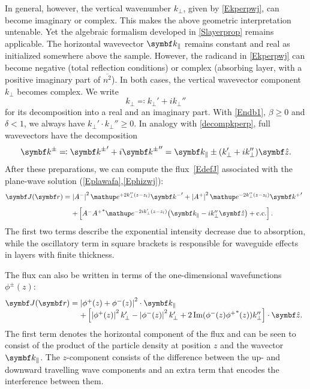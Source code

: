 In general, however, the vertical wavenumber $k_{\perp}$,
given by \cref{Ekperpwj},
can become imaginary or complex.
This makes the above geometric interpretation untenable.
Yet the algebraic formalism developed in \cref{Slayerprop}
remains applicable.
The horizontal wavevector $\k_\plll$ remains constant and real
as initialized somewhere above the sample.
However, the radicand in \cref{Ekperpwj} can become
negative (total reflection conditions) or complex
(absorbing layer,
with a positive imaginary part of $\overline{n^2}$).
In both cases, the vertical wavevector component $k_{\perp}$
becomes complex.
%
We write
\begin{equation}\label{decompkperp}
  k_\perp \eqqcolon k_\perp' + i k_\perp''
\end{equation}
for its decomposition into a real and an imaginary part.
With \cref{Endb1}, $\beta\ge0$ and $\delta<1$,
we always have $k_\perp'\cdot k_\perp''\ge0$.
In analogy with \cref{decompkperp},
full wavevectors have the decomposition
\begin{equation}
  \k^\pm
  \eqqcolon {\k^\pm}' + i{\k^\pm}''
  = \k_\plll \pm (k_\perp' + i k_\perp'')\v{\hat z}.
\end{equation}
After these preparations,
we can compute the flux~\cref{EdefJ}
associated with the plane-wave solution (\ref{Eplawafa},\ref{Ephizwj}):
\begin{equation}
  \begin{array}{@{}l@{\;}l}
  \v{J}(\r)
  =&   \left|A^-\right|^2 \e^{+2k_\perp'' (z-z_l)} {\k^-}'
    + \left|A^+\right|^2 \e^{-2k_\perp''(z-z_l)} {\k^+}'
\\[2ex]
  &+ \left[
      A^-{A^+}^* \e^{-2ik_\perp'(z-z_l)} {\left(\k_\plll-ik_\perp''\v{\hat z}\right)}
    + \text{c.c.}
    \right].
  \end{array}
\end{equation}
The first two terms describe the exponential intensity decrease
due to absorption, while
the oscillatory term in square brackets
is responsible for waveguide effects in layers with finite thickness.

The flux can also be written in terms of the one-dimensional wavefunctions $\phi^{\pm}(z)$:
\begin{equation}
  \begin{array}{@{}l@{\;}l}
  \v{J}(\r) =& \left|\phi^+(z)+\phi^-(z)\right|^2\cdot\k_\plll \\
  &+ \left[ \left|\phi^+(z)\right|^2 k_\perp' - \left|\phi^-(z)\right|^2 k_\perp' +
  2\Im(\phi^-(z){\phi^+}^*(z))k_\perp'' \right]\cdot \v{\hat z}.
  \end{array}
\end{equation}
The first term denotes the horizontal component of the flux and can be seen to consist of the product
of the particle density at position $z$ and the wavector $\k_\plll$. The $z$-component consists of the difference between the up- and downward travelling wave components and an extra term that encodes the interference between them.


